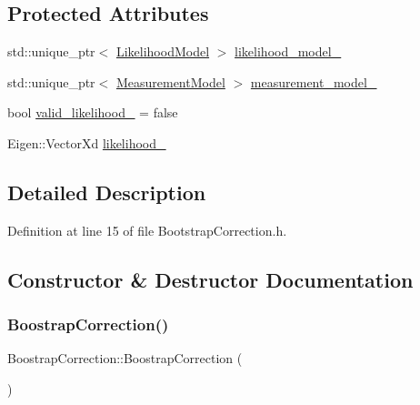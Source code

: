 \subsection*{Protected Attributes}
\begin{DoxyCompactItemize}
\item 
std\+::unique\+\_\+ptr$<$ \mbox{\hyperlink{classbfl_1_1LikelihoodModel}{Likelihood\+Model}} $>$ \mbox{\hyperlink{classbfl_1_1BoostrapCorrection_aaef6c382ea35a46474c3c3c7300cf6d9}{likelihood\+\_\+model\+\_\+}}
\item 
std\+::unique\+\_\+ptr$<$ \mbox{\hyperlink{classbfl_1_1MeasurementModel}{Measurement\+Model}} $>$ \mbox{\hyperlink{classbfl_1_1BoostrapCorrection_a06929b7db97b01b7e8e1c0d4f5a19274}{measurement\+\_\+model\+\_\+}}
\item 
bool \mbox{\hyperlink{classbfl_1_1BoostrapCorrection_af61251e64b3d4c0b95af7a2fd6adf0c5}{valid\+\_\+likelihood\+\_\+}} = false
\item 
Eigen\+::\+Vector\+Xd \mbox{\hyperlink{classbfl_1_1BoostrapCorrection_ae35bcabcf28cd7d46f5581c33f1c9390}{likelihood\+\_\+}}
\end{DoxyCompactItemize}


\subsection{Detailed Description}


Definition at line 15 of file Bootstrap\+Correction.\+h.



\subsection{Constructor \& Destructor Documentation}
\mbox{\label{classbfl_1_1BoostrapCorrection_a0745f5bb495d8afea6cbbbf426ab81ed}} 
\subsubsection{\texorpdfstring{Boostrap\+Correction()}{BoostrapCorrection()}}
{\footnotesize\ttfamily Boostrap\+Correction\+::\+Boostrap\+Correction (\begin{DoxyParamCaption}{ }\end{DoxyParamCaption})\hspace{0.3cm}{\ttfamily [noexcept]}}




